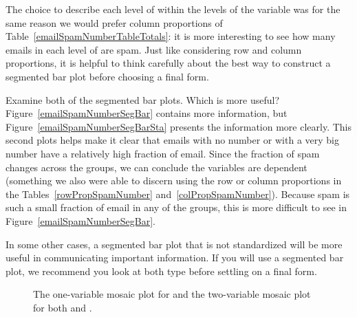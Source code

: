The choice to describe each level of  within the levels of the  variable was for the same reason we would prefer column proportions of Table~\ref{emailSpamNumberTableTotals}: it is more interesting to see how many emails in each level of  are spam. Just like considering row and column proportions, it is helpful to think carefully about the best way to construct a segmented bar plot before choosing a final form.

\begin{example}{Examine both of the segmented bar plots. Which is more useful?}
Figure~\ref{emailSpamNumberSegBar} contains more information, but Figure~\ref{emailSpamNumberSegBarSta} presents the information more clearly. This second plots helps make it clear that emails with no number or with a very big number have a relatively high fraction of email. Since the fraction of spam changes across the groups, we can conclude the variables are dependent (something we also were able to discern using the row or column proportions in the Tables~\ref{rowPropSpamNumber} and~\ref{colPropSpamNumber}). Because spam is such a small fraction of email in any of the groups, this is more difficult to see in Figure~\ref{emailSpamNumberSegBar}.

In some other cases, a segmented bar plot that is not standardized will be more useful in communicating important information. If you will use a segmented bar plot, we recommend you look at both type before settling on a final form.
\end{example}

\begin{figure}[p]
\centering
{}
\caption{The one-variable mosaic plot for  and the two-variable mosaic plot for both  and .}
\label{emailSpamNumberMosaicPlot}
\end{figure}

